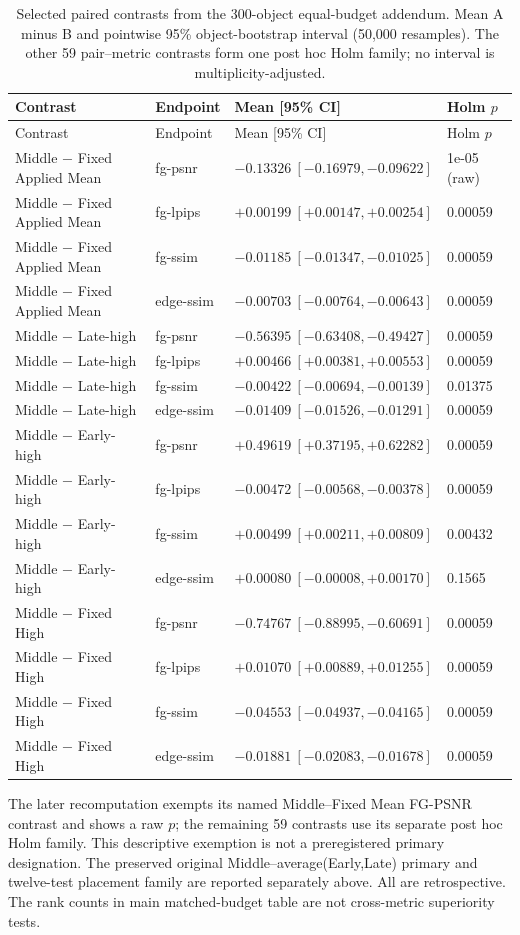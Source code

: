 \documentclass[11pt]{article}
\begin{document}
\begingroup\scriptsize
\begin{longtable}{llll}
\caption{Selected paired contrasts from the 300-object equal-budget addendum. Mean A minus B and pointwise 95\% object-bootstrap interval (50,000 resamples). The other 59 pair--metric contrasts form one post hoc Holm family; no interval is multiplicity-adjusted.}\label{tab:budget300paired}\\
\toprule Contrast & Endpoint & Mean [95\% CI] & Holm $p$ \\
\midrule\endfirsthead
\toprule Contrast & Endpoint & Mean [95\% CI] & Holm $p$ \\
\midrule\endhead
Middle $-$ Fixed Applied Mean & fg-psnr & $-0.13326\ [-0.16979,-0.09622]$ & 1e-05 (raw) \\
Middle $-$ Fixed Applied Mean & fg-lpips & $+0.00199\ [+0.00147,+0.00254]$ & 0.00059 \\
Middle $-$ Fixed Applied Mean & fg-ssim & $-0.01185\ [-0.01347,-0.01025]$ & 0.00059 \\
Middle $-$ Fixed Applied Mean & edge-ssim & $-0.00703\ [-0.00764,-0.00643]$ & 0.00059 \\
Middle $-$ Late-high & fg-psnr & $-0.56395\ [-0.63408,-0.49427]$ & 0.00059 \\
Middle $-$ Late-high & fg-lpips & $+0.00466\ [+0.00381,+0.00553]$ & 0.00059 \\
Middle $-$ Late-high & fg-ssim & $-0.00422\ [-0.00694,-0.00139]$ & 0.01375 \\
Middle $-$ Late-high & edge-ssim & $-0.01409\ [-0.01526,-0.01291]$ & 0.00059 \\
Middle $-$ Early-high & fg-psnr & $+0.49619\ [+0.37195,+0.62282]$ & 0.00059 \\
Middle $-$ Early-high & fg-lpips & $-0.00472\ [-0.00568,-0.00378]$ & 0.00059 \\
Middle $-$ Early-high & fg-ssim & $+0.00499\ [+0.00211,+0.00809]$ & 0.00432 \\
Middle $-$ Early-high & edge-ssim & $+0.00080\ [-0.00008,+0.00170]$ & 0.1565 \\
Middle $-$ Fixed High & fg-psnr & $-0.74767\ [-0.88995,-0.60691]$ & 0.00059 \\
Middle $-$ Fixed High & fg-lpips & $+0.01070\ [+0.00889,+0.01255]$ & 0.00059 \\
Middle $-$ Fixed High & fg-ssim & $-0.04553\ [-0.04937,-0.04165]$ & 0.00059 \\
Middle $-$ Fixed High & edge-ssim & $-0.01881\ [-0.02083,-0.01678]$ & 0.00059 \\
\bottomrule
\end{longtable}\endgroup
The later recomputation exempts its named Middle--Fixed Mean FG-PSNR contrast and shows a raw $p$; the remaining 59 contrasts use its separate post hoc Holm family. This descriptive exemption is not a preregistered primary designation. The preserved original Middle--average(Early,Late) primary and twelve-test placement family are reported separately above. All are retrospective. The rank counts in main matched-budget table are not cross-metric superiority tests.
\end{document}
